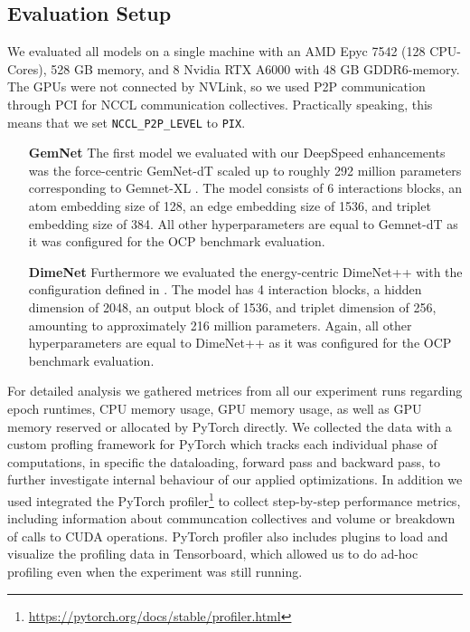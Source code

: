 \subsection{Evaluation Setup}

We evaluated all models on a single machine with an AMD Epyc 7542 (128 CPU-Cores), 528 GB memory, 
and 8 Nvidia RTX A6000 with 48 GB GDDR6-memory. The GPUs were not connected by NVLink, so we used 
P2P communication through PCI for NCCL communication collectives. Practically speaking, this 
means that we set \texttt{NCCL\_P2P\_LEVEL} to \texttt{PIX}.

\begin{enumerate}[align=left]
    \item[\textbf{GemNet}] The first model we evaluated with our DeepSpeed enhancements was 
    the force-centric GemNet-dT scaled up to roughly 292 million parameters corresponding to 
    Gemnet-XL \cite*{https://doi.org/10.48550/arxiv.2203.09697}. 
    The model consists of 6 interactions blocks, an atom embedding size of 128, an edge 
    embedding size of 1536, and triplet embedding size of 384. All other hyperparameters are equal 
    to Gemnet-dT as it was configured for the OCP benchmark evaluation.

    \item[\textbf{DimeNet}] Furthermore we evaluated the energy-centric DimeNet++ with the configuration 
    defined in \cite*{https://doi.org/10.48550/arxiv.2203.09697}. The model has 4 interaction blocks, a hidden 
    dimension of 2048, an output block of 1536, and triplet dimension of 256, amounting to approximately 
    216 million parameters. Again, all other hyperparameters are equal to DimeNet++ as it was configured 
    for the OCP benchmark evaluation.
\end{enumerate}

For detailed analysis we gathered metrices from all our experiment runs regarding epoch runtimes, 
CPU memory usage, GPU memory usage, as well as GPU memory reserved or allocated by PyTorch directly.
We collected the data with a custom profling framework for PyTorch which tracks each individual phase 
of computations, in specific the dataloading, forward pass and backward pass, to further investigate 
internal behaviour of our applied optimizations. 
In addition we used integrated the PyTorch profiler\footnote{\url{https://pytorch.org/docs/stable/profiler.html}}
to collect step-by-step performance metrics, including information about communcation collectives and 
volume or breakdown of calls to CUDA operations. PyTorch profiler also includes plugins to 
load and visualize the profiling data in Tensorboard, which allowed us to do ad-hoc profiling 
even when the experiment was still running.



